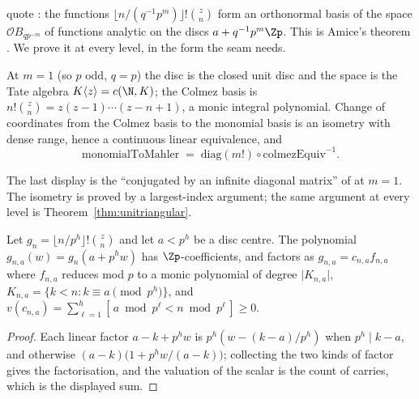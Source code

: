 \cite[\S2.16]{LWX} quote \cite[Th\'eor\`eme 1.29]{Colmez}: the functions
$\lfloor n/(q^{-1}p^{m})\rfloor!\binom{z}{n}$ form an orthonormal basis of the space
$\mathcal{O}B_{qp^{-m}}$ of functions analytic on the discs $a+q^{-1}p^{m}\Zp$.  This is Amice's
theorem \cite{Amice}.  We prove it at every level, in the form the seam needs.

\begin{proposition}[Level $m=1$]
  \label{prop:colmez-m1}
  \leanok
  At $m=1$ (so $p$ odd, $q=p$) the disc is the closed unit disc and the space is the Tate algebra
  $K\langle z\rangle = c(\N,K)$; the Colmez basis is
  $n!\binom{z}{n} = z(z-1)\cdots(z-n+1)$, a monic integral polynomial.  Change of coordinates
  from the Colmez basis to the monomial basis is an isometry with dense range, hence a continuous
  linear equivalence, and
  \[
    \mathrm{monomialToMahler} \;=\; \mathrm{diag}(m!)\circ\mathrm{colmezEquiv}^{-1} .
  \]
\end{proposition}

The last display is the ``conjugated by an infinite diagonal matrix'' of
\cite[proof of Proposition 2.17]{LWX} at $m=1$.  The isometry is proved by a largest-index
argument; the same argument at every level is Theorem~\ref{thm:unitriangular}.

\begin{lemma}
  \label{lem:colmez-valuation}
  \leanok
  Let $g_n = \lfloor n/p^{h}\rfloor!\binom{z}{n}$ and let $a < p^{h}$ be a disc centre.  The
  polynomial $g_{n,a}(w) = g_n(a+p^{h}w)$ has $\Zp$-coefficients, and factors as
  $g_{n,a} = c_{n,a}f_{n,a}$ where $f_{n,a}$ reduces mod $p$ to a monic polynomial of degree
  $\lvert K_{n,a}\rvert$, $K_{n,a} = \{k<n : k\equiv a \pmod{p^{h}}\}$, and
  $v(c_{n,a}) = \sum_{\ell=1}^{h}[\,a \bmod p^{\ell} < n\bmod p^{\ell}\,] \geq 0$.
\end{lemma}

\begin{proof}
  \leanok
  Each linear factor $a-k+p^{h}w$ is $p^{h}(w-(k-a)/p^{h})$ when $p^{h}\mid k-a$, and otherwise
  $(a-k)\bigl(1+p^{h}w/(a-k)\bigr)$; collecting the two kinds of factor gives the factorisation,
  and the valuation of the scalar is the count of carries, which is the displayed sum.
\end{proof}

